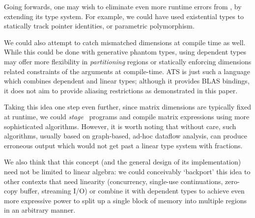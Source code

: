 Going forwards, one may wish to eliminate even more runtime errors from \lang,
by extending its type system. For example, we could have used existential types
to statically track pointer identities\cite{morrisett}, or parametric
polymorphism.

We could also attempt to catch mismatched dimensions at compile time as well.
While this could be done with generative phantom types\cite{abe2015simple},
using dependent types may offer more flexibility in \emph{partitioning}
regions\cite{space_monads} or statically enforcing dimensions related
constraints of the arguments at compile-time.  ATS\cite{cui2005ats} is just
such a language which combines dependent and linear types; although it provides
BLAS bindings, it does not aim to provide aliasing restrictions as demonstrated
in this paper.

Taking this idea one step even further, since matrix dimensions are typically
fixed at runtime, we could \emph{stage} \lang\ programs and compile matrix
expressions using more sophisticated algorithms\cite{barthels}. However, it is
worth noting that without care, such algorithms\cite{rocklin_thesis}, usually
based on graph-based, ad-hoc dataflow analysis, can produce erroneous output
which would not get past a linear type system with fractions.

We also think that this concept (and the general design of its implementation)
need not be limited to linear algebra: we could conceivably `backport' this
idea to other contexts that need linearity (concurrency, single-use
continuations, zero-copy buffer, streaming I/O) or combine it with dependent
types to achieve even more expressive power to split up a single block of
memory into multiple regions in an arbitrary manner\cite{space_monads}.
